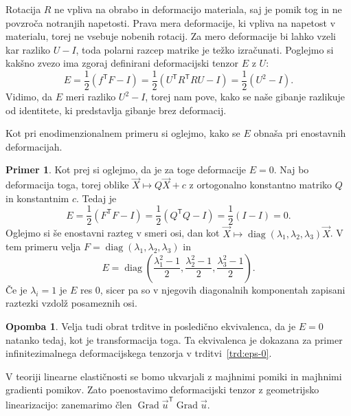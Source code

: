 \documentclass[12pt,a4paper,twoside]{article}
\theoremstyle{definition} %
\newtheorem{primer}[definicija]{Primer}
\newtheorem{opomba}[definicija]{Opomba}
\theoremstyle{plain} %
\numberwithin{equation}{section}
\newcommand{\T}{\mathsf{T}}
\newcommand{\Grad}{\operatorname{Grad}}
\newcommand{\vu}{\vec{u}}
\newcommand{\vX}{\vec{X}}
\DeclareMathOperator{\diag}{diag}
\begin{document}
Rotacija $R$ ne vpliva na obrabo in deformacijo materiala, saj je pomik tog in ne povzroča notranjih
napetosti. Prava mera deformacije, ki vpliva na napetost v materialu, torej ne vsebuje nobenih
rotacij. Za mero deformacije bi lahko vzeli kar razliko $U - I$, toda polarni razcep matrike je
težko izračunati. Poglejmo si kakšno zvezo ima zgoraj definirani deformacijski tenzor $E$ z $U$:
\begin{equation}
   E = \frac12(f^\T F - I) = \frac12(U^\T R^\T R U - I) = \frac12 (U^2 - I).
\end{equation}
Vidimo, da $E$ meri razliko $U^2 - I$, torej nam pove, kako se naše gibanje razlikuje od identitete,
ki predstavlja gibanje brez deformacij.

Kot pri enodimenzionalnem primeru si oglejmo, kako se $E$ obnaša pri enostavnih
deformacijah.
\begin{primer}
  Kot prej si oglejmo, da je za toge deformacije $E = 0$.  Naj bo deformacija toga, torej oblike
  $\vX \mapsto Q\vX + c$ z ortogonalno konstantno matriko $Q$ in konstantnim $c$. Tedaj je
  \begin{equation}
     E = \frac12 (F^\T F - I) = \frac12(Q^\T Q - I) = \frac12(I - I) = 0.
  \end{equation}
  Oglejmo si še enostavni razteg v smeri osi, dan kot
  $\vX \mapsto \diag(\lambda_1, \lambda_2, \lambda_3) \vX$.
  V tem primeru velja $F = \diag(\lambda_1, \lambda_2, \lambda_3)$ in
  \begin{equation}
    E = \diag\left(
      \frac{\lambda_1^2-1}{2},
      \frac{\lambda_2^2-1}{2},
      \frac{\lambda_3^2-1}{2}
    \right).
  \end{equation}
  Če je $\lambda_i = 1$ je $E$ res 0, sicer pa so v njegovih diagonalnih
  komponentah zapisani raztezki vzdolž posameznih osi.
\end{primer}
\begin{opomba}
  Velja tudi obrat trditve in posledično ekvivalenca, da je $E = 0$ natanko tedaj, kot je
  transformacija toga. Ta ekvivalenca je dokazana za primer infinitezimalnega deformacijskega
  tenzorja v trditvi~\ref{trd:eps-0}.
\end{opomba}

V teoriji linearne elastičnosti se bomo ukvarjali z majhnimi pomiki in majhnimi
gradienti pomikov. Zato poenostavimo deformacijski tenzor z geometrijsko
linearizacijo: zanemarimo člen $\Grad \vu^\T \Grad \vu$.
\end{document}
